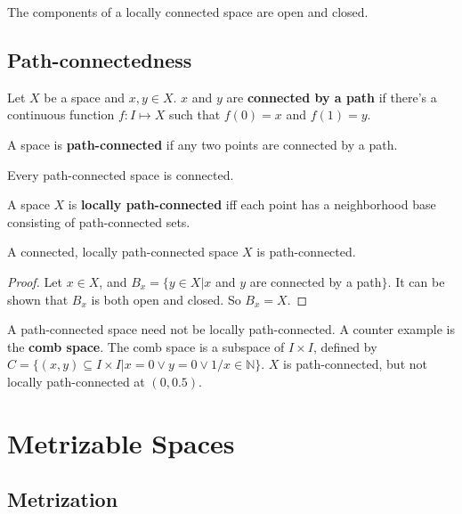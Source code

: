 \documentclass[12pt]{book}
\begin{document}
\begin{corollary}
	The components of a locally connected space are open and closed.
\end{corollary}

\section{Path-connectedness}

\begin{definition}
	Let $X$ be a space and $x,y\in X$. $x$ and $y$ are {\bf connected by a path} if there's a continuous function $f:I\mapsto X$ such that $f(0)=x$ and $f(1)=y$.
\end{definition}

\begin{definition}
	A space is {\bf path-connected} if any two points are connected by a path.
\end{definition}

\begin{lemma}
	Every path-connected space is connected.
\end{lemma}

\begin{definition}
	A space $X$ is {\bf locally path-connected} iff each point has a neighborhood base consisting of path-connected sets.
\end{definition}

\begin{theorem}
	A connected, locally path-connected space $X$ is path-connected.
\end{theorem}
\begin{proof}
	Let $x\in X$, and $B_x=\{y\in X| x$ and $y$ are connected by a path$\}$. It can be shown that $B_x$ is both open and closed. So $B_x=X$.
\end{proof}

\begin{example}
	A path-connected space need not be locally path-connected. A counter example is the {\bf comb space}. The comb space is a subspace of $I\times I$, defined by $C=\{(x,y)\subseteq I\times I|x=0\vee y=0\vee 1/x\in\mathbb N\}$. $X$ is path-connected, but not locally path-connected at $(0,0.5)$.
\end{example}

\chapter{Metrizable Spaces}

\section{Metrization}
\end{document}
